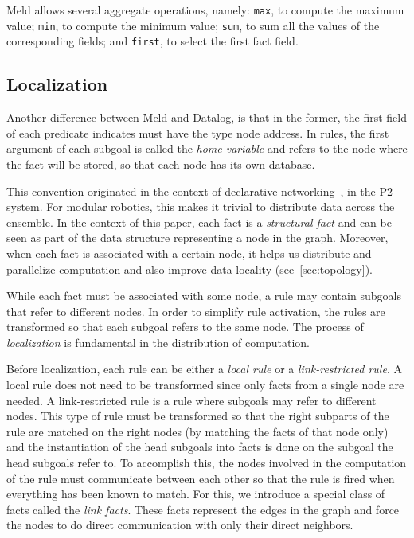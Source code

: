 \documentclass[preprint]{sigplanconf}
\begin{document}
Meld allows several aggregate operations, namely: \texttt{max}, to compute the maximum value;
\texttt{min}, to compute the minimum value; \texttt{sum}, to sum all the values of the corresponding
fields; and \texttt{first}, to select the first fact field.

\subsection{Localization}\label{sec:localization}

Another difference between Meld and Datalog, is that in the former, the first field
of each predicate indicates must have the type node address.
In rules, the first argument of each subgoal is called the \emph{home variable} and
refers to the node where the fact will be stored, so that each node has its own database.

This convention originated in the context of declarative networking~\cite{Loo-condie-garofalakis-p2},
in the P2 system. For modular robotics, this makes it trivial to
distribute data across the ensemble. In the context of this paper, each fact is a
\emph{structural fact} and can be seen as part of the data structure representing a node in the graph.
Moreover, when each fact is associated with a certain node, it helps us distribute
and parallelize computation and also improve data locality (see~\ref{sec:topology}).

While each fact must be associated with some node, a rule may contain subgoals that refer to
different nodes. In order to simplify rule activation, the rules are transformed so that
each subgoal refers to the same node. The process of \emph{localization} is fundamental
in the distribution of computation.

Before localization, each rule can be either a \emph{local rule} or a \emph{link-restricted rule}.
A local rule does not need to be transformed since only facts from a single node are needed.
A link-restricted rule is a rule where subgoals may refer to different nodes. This type of rule
must be transformed so that the right subparts of the rule are matched
on the right nodes (by matching the facts of that node only)
and the instantiation of the head subgoals into facts is done on the subgoal the head subgoals
refer to. To accomplish this, the nodes involved in the computation of the rule must communicate
between each other so that the rule is fired when everything has been known to match.
For this, we introduce a special class of facts called the \emph{link facts}. These facts
represent the edges in the graph and force the nodes to do direct communication with
only their direct neighbors.
\end{document}
